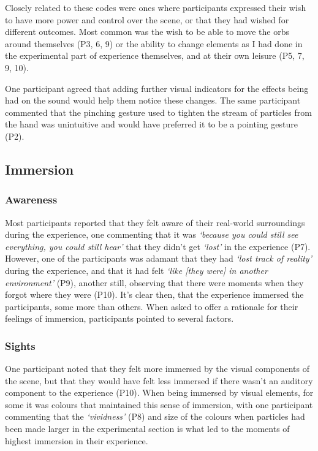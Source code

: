 Closely related to these codes were ones where participants expressed their wish to have more power and control over the scene, or that they had wished for different outcomes. Most common was the wish to be able to move the orbs around themselves (P3, 6, 9) or the ability to change elements as I had done in the experimental part of experience themselves, and at their own leisure (P5, 7, 9, 10).

One participant agreed that adding further visual indicators for the effects being had on the sound would help them notice these changes. The same participant commented that the pinching gesture used to tighten the stream of particles from the hand was unintuitive and would have preferred it to be a pointing gesture (P2).

\subsection{Immersion}\label{sec: polaris-feedback-immersion}
\subsubsection{Awareness}\label{sec: polaris-feedback-immersion-awareness}
Most participants reported that they felt aware of their real-world surroundings during the experience, one commenting that it was \textit{`because you could still see everything, you could still hear'} that they didn't get \textit{`lost'} in the experience (P7). However, one of the participants was adamant that they had \textit{`lost track of reality'} during the experience, and that it had felt \textit{`like [they were] in another environment'} (P9), another still, observing that there were moments when they forgot where they were (P10). It's clear then, that the experience immersed the participants, some more than others. When asked to offer a rationale for their feelings of immersion, participants pointed to several factors.

\subsubsection{Sights}\label{sec: polaris-feedback-immersion-sights}
One participant noted that they felt more immersed by the visual components of the scene, but that they would have felt less immersed if there wasn't an auditory component to the experience (P10). When being immersed by visual elements, for some it was colours that maintained this sense of immersion, with one participant commenting that the \textit{`vividness'} (P8) and size of the colours when particles had been made larger in the experimental section is what led to the moments of highest immersion in their experience.

